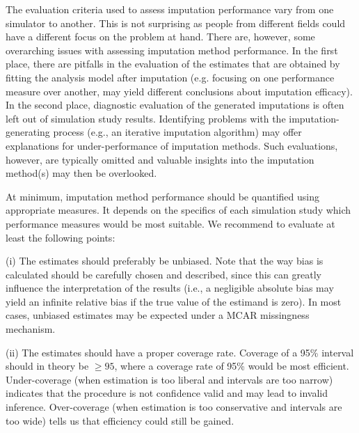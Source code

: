 \documentclass[bimj,fleqn]{w-art}
\begin{document}
The evaluation criteria used to assess imputation performance vary from one simulator to another. This is not surprising as people from different fields could have a different focus on the problem at hand. There are, however, some overarching issues with assessing imputation method performance. In the first place, there are pitfalls in the evaluation of the estimates that are obtained by fitting the analysis model after imputation (e.g. focusing on one performance measure over another, may yield different conclusions about imputation efficacy). In the second place, diagnostic evaluation of the generated imputations is often left out of simulation study results. Identifying problems with the imputation-generating process (e.g., an iterative imputation algorithm) may offer explanations for under-performance of imputation methods. Such evaluations, however, are typically omitted and valuable insights into the imputation method(s) may then be overlooked. %

At minimum, imputation method performance should be quantified using appropriate measures. It depends on the specifics of each simulation study which performance measures would be most suitable. We recommend to evaluate at least the following points:

(i) The estimates should preferably be unbiased. Note that the way bias is calculated should be carefully chosen and described, since this can greatly influence the interpretation of the results (i.e., a negligible absolute bias may yield an infinite relative bias if the true value of the estimand is zero). In most cases, unbiased estimates may be expected under a MCAR missingness mechanism.

(ii) The estimates should have a proper coverage rate. Coverage of a 95\% interval should in theory be $\geq 95$, where a coverage rate of 95\% would be most efficient. Under-coverage (when estimation is too liberal and intervals are too narrow) indicates that the procedure is not confidence valid and may lead to invalid inference. Over-coverage (when estimation is too conservative and intervals are too wide) tells us that efficiency could still be gained. 

\end{document}
